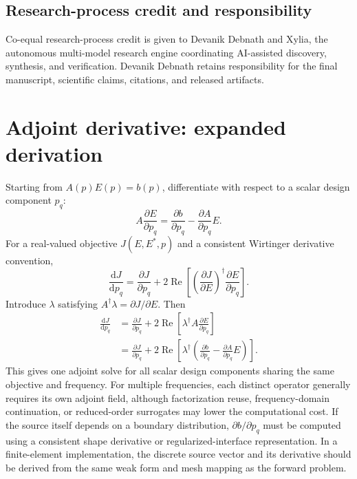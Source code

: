 \documentclass[10.5pt,a4paper]{article}
\newcommand{\Real}{\operatorname{Re}}
\begin{document}
\subsection*{Research-process credit and responsibility}
Co-equal research-process credit is given to Devanik Debnath and Xylia, the autonomous multi-model research engine coordinating AI-assisted discovery, synthesis, and verification. Devanik Debnath retains responsibility for the final manuscript, scientific claims, citations, and released artifacts.

\appendix
\section{Adjoint derivative: expanded derivation}
Starting from $A(p)E(p)=b(p)$, differentiate with respect to a scalar design component $p_q$:
\begin{equation}
A\frac{\partial E}{\partial p_q}=\frac{\partial b}{\partial p_q}-\frac{\partial A}{\partial p_q}E.
\end{equation}
For a real-valued objective $J(E,E^*,p)$ and a consistent Wirtinger derivative convention,
\begin{equation}
\frac{\mathrm dJ}{\mathrm dp_q}=\frac{\partial J}{\partial p_q}+2\Real\!\left[\left(\frac{\partial J}{\partial E}\right)^\dagger\frac{\partial E}{\partial p_q}\right].
\end{equation}
Introduce $\lambda$ satisfying $A^\dagger\lambda=\partial J/\partial E$. Then
\begin{align}
\frac{\mathrm dJ}{\mathrm dp_q}&=\frac{\partial J}{\partial p_q}+2\Real\!\left[\lambda^\dagger A\frac{\partial E}{\partial p_q}\right]\\
&=\frac{\partial J}{\partial p_q}+2\Real\!\left[\lambda^\dagger\left(\frac{\partial b}{\partial p_q}-\frac{\partial A}{\partial p_q}E\right)\right].
\end{align}
This gives one adjoint solve for all scalar design components sharing the same objective and frequency. For multiple frequencies, each distinct operator generally requires its own adjoint field, although factorization reuse, frequency-domain continuation, or reduced-order surrogates may lower the computational cost. If the source itself depends on a boundary distribution, $\partial b/\partial p_q$ must be computed using a consistent shape derivative or regularized-interface representation. In a finite-element implementation, the discrete source vector and its derivative should be derived from the same weak form and mesh mapping as the forward problem.
\end{document}
